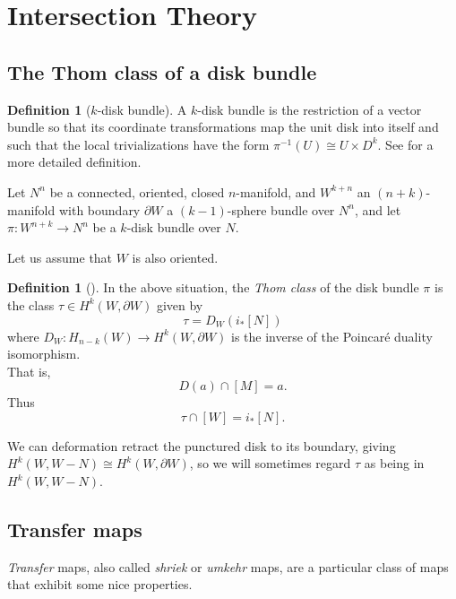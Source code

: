 \documentclass[reqno]{amsart}
\theoremstyle{definition}
\newtheorem{definition}[theorem]{Definition}
\theoremstyle{remark}
\begin{document}
      



      


\section{Intersection Theory}

\subsection{The Thom class of a disk bundle}

\begin{definition}[$k$-disk bundle]
    A $k$-disk bundle is the restriction of a vector bundle so that its
    coordinate transformations map
    the unit disk into itself and such that
    the local trivializations have the form
    $\pi^{-1}(U) \cong U \times D^{k}$.
    See \cite{Bredon} for a more detailed definition.
\end{definition}

Let $N^{n}$ be a connected, oriented, closed $n$-manifold, and
$W^{k+n}$ an $(n+k)$-manifold with boundary
$\partial W$ a $(k-1)$-sphere bundle over $N^{n}$, and let
$\pi \colon W^{n+k} \to N^{n}$ be a $k$-disk bundle over $N$.

Let us assume that $W$ is also oriented.

\begin{definition}[]
    In the above situation, the \textit{Thom class} of the
    disk bundle $\pi$ is the class $\tau \in 
    H^{k}\left( W, \partial W \right) $ given by
    \[
    \tau = D_W \left( i_* \left[ N \right]  \right) 
    \] 
    where $D_W \colon H_{n-k} (W) \to H^{k}(W, \partial W)$ is
    the inverse of the Poincaré duality isomorphism.\\
    That is,
    \[
    D(a) \cap \left[ M \right]  = a.
    \] 
    Thus
    \[
    \tau \cap \left[ W \right] =
    i_* \left[ N \right] .
    \] 
\end{definition}

We can deformation retract the punctured disk to its boundary, giving
$H^{k}(W, W-N) \cong H^{k}(W, \partial W)$, so we will
sometimes regard
$\tau$ as being in $H^{k}(W, W-N)$.


\subsection{Transfer maps}

\textit{Transfer} maps, also called \textit{shriek} or
\textit{umkehr} maps, are a particular class of maps that exhibit 
some nice properties. 
\end{document}
